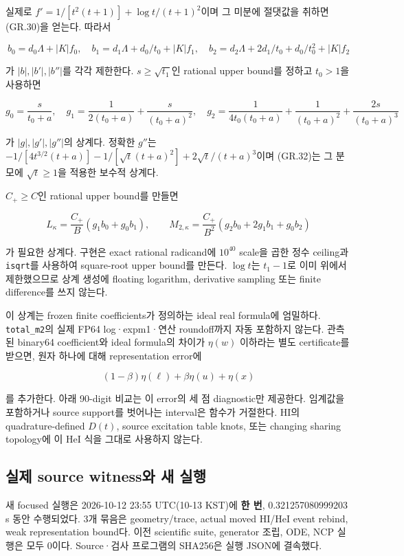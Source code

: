 실제로 \(f'=1/[t^2(t+1)]+\log t/(t+1)^2\)이며 그 미분에 절댓값을 취하면 (GR.30)을 얻는다. 따라서

\[
 b_0=d_0\Lambda+|K|f_0,\quad
 b_1=d_1\Lambda+d_0/t_0+|K|f_1,\quad
 b_2=d_2\Lambda+2d_1/t_0+d_0/t_0^2+|K|f_2
\tag{GR.31}
\]

가 \(|b|,|b'|,|b''|\)를 각각 제한한다. \(s\ge\sqrt{t_1}\)인 rational upper bound를 정하고 \(t_0>1\)을 사용하면

\[
 g_0=\frac{s}{t_0+a},\quad
 g_1=\frac1{2(t_0+a)}+\frac{s}{(t_0+a)^2},\quad
 g_2=\frac1{4t_0(t_0+a)}+\frac1{(t_0+a)^2}
        +\frac{2s}{(t_0+a)^3}
\tag{GR.32}
\]

가 \(|g|,|g'|,|g''|\)의 상계다. 정확한 \(g''\)는 \(-1/[4t^{3/2}(t+a)]-1/[\sqrt t(t+a)^2]+2\sqrt t/(t+a)^3\)이며 (GR.32)는 그 분모에 \(\sqrt t\ge1\)을 적용한 보수적 상계다.

\(C_+\ge C\)인 rational upper bound를 만들면

\[
 L_\kappa=\frac{C_+}{B}(g_1b_0+g_0b_1),\qquad
 M_{2,\kappa}=\frac{C_+}{B^2}(g_2b_0+2g_1b_1+g_0b_2)
\tag{GR.33}
\]

가 필요한 상계다. 구현은 exact rational radicand에 \(10^{40}\) scale을 곱한 정수 ceiling과 \texttt{isqrt}를 사용하여 square-root upper bound를 만든다. \(\log t\)는 \(t_1-1\)로 이미 위에서 제한했으므로 상계 생성에 floating logarithm, derivative sampling 또는 finite difference를 쓰지 않는다.

이 상계는 frozen finite coefficients가 정의하는 ideal real formula에 엄밀하다. \texttt{total\_m2}의 실제 FP64 log·expm1·연산 roundoff까지 자동 포함하지 않는다. 관측된 binary64 coefficient와 ideal formula의 차이가 \(\eta(w)\) 이하라는 별도 certificate를 받으면, 원자 하나에 대해 representation error에

\[
 (1-\beta)\eta(\ell)+\beta\eta(u)+\eta(x)
\tag{GR.34}
\]

를 추가한다. 아래 90-digit 비교는 이 error의 세 점 diagnostic만 제공한다. 임계값을 포함하거나 source support를 벗어나는 interval은 함수가 거절한다. HI의 quadrature-defined \(D(t)\), source excitation table knots, 또는 changing sharing topology에 이 HeI 식을 그대로 사용하지 않는다.

\hypertarget{uxc2e4uxc81c-source-witnessuxc640-uxc0c8-uxc2e4uxd589}{%
\subsection{실제 source witness와 새 실행}\label{uxc2e4uxc81c-source-witnessuxc640-uxc0c8-uxc2e4uxd589}}

새 focused 실행은 2026-10-12 23:55 UTC(10-13 KST)에 \textbf{한 번}, 0.321257080999203 s 동안 수행되었다. 3개 묶음은 geometry/trace, actual moved HI/HeI event rebind, weak representation bound다. 이전 scientific suite, generator 조립, ODE, NCP 실행은 모두 0이다. Source·검사 프로그램의 SHA256은 실행 JSON에 결속했다.

